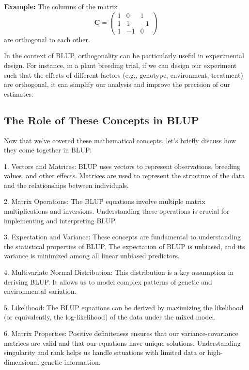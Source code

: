 \documentclass[12pt,a4paper]{article}
\begin{document}
\textbf{Example:}
The columns of the matrix $$\mathbf{C} = \begin{pmatrix} 1 & 0 & 1 \\ 1 & 1 & -1 \\ 1 & -1 & 0 \end{pmatrix}$$ are orthogonal to each other.

In the context of BLUP, orthogonality can be particularly useful in experimental design. For instance, in a plant breeding trial, if we can design our experiment such that the effects of different factors (e.g., genotype, environment, treatment) are orthogonal, it can simplify our analysis and improve the precision of our estimates.

\subsection{The Role of These Concepts in BLUP}

Now that we've covered these mathematical concepts, let's briefly discuss how they come together in BLUP:

1. Vectors and Matrices: BLUP uses vectors to represent observations, breeding values, and other effects. Matrices are used to represent the structure of the data and the relationships between individuals.

2. Matrix Operations: The BLUP equations involve multiple matrix multiplications and inversions. Understanding these operations is crucial for implementing and interpreting BLUP.

3. Expectation and Variance: These concepts are fundamental to understanding the statistical properties of BLUP. The expectation of BLUP is unbiased, and its variance is minimized among all linear unbiased predictors.

4. Multivariate Normal Distribution: This distribution is a key assumption in deriving BLUP. It allows us to model complex patterns of genetic and environmental variation.

5. Likelihood: The BLUP equations can be derived by maximizing the likelihood (or equivalently, the log-likelihood) of the data under the mixed model.

6. Matrix Properties: Positive definiteness ensures that our variance-covariance matrices are valid and that our equations have unique solutions. Understanding singularity and rank helps us handle situations with limited data or high-dimensional genetic information.
\end{document}
